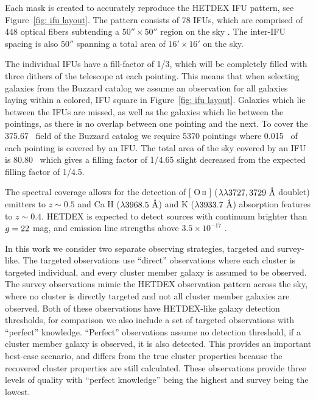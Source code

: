 \documentclass[fleqn,usenatbib]{mnras}
\makeatletter
\DeclareRobustCommand{\ion}[2]{%
\relax\ifmmode
\ifx\testbx\f@series
{\mathbf{#1\,\mathsc{#2}}}\else
{\mathrm{#1\,\mathsc{#2}}}\fi
\else\textup{#1\,{\mdseries\textsc{#2}}}%
\fi}
\makeatother
\begin{document}
Each mask is created to accurately reproduce the HETDEX IFU pattern, see Figure~\ref{fig: ifu layout}. The pattern consists of 78 IFUs, which are comprised of 448 optical fibers subtending a $50'' \times 50''$ region on the sky \citep{Kelz2014}. The inter-IFU spacing is also $50''$ spanning a total area of $16'\times 16'$ on the sky. 

The individual IFUs have a fill-factor of 1/3, which will be completely filled with three dithers of the telescope at each pointing. This means that when selecting galaxies from the Buzzard catalog we assume an observation for all galaxies laying within a colored, IFU square in Figure~\ref{fig: ifu layout}. Galaxies which lie between the IFUs are missed, as well as the galaxies which lie between the pointings, as there is no overlap between one pointing and the next. To cover the 375.67 \degsq\ field of the Buzzard catalog we require 5370 pointings where 0.015 \degsq\ of each pointing is covered by an IFU. The total area of the sky covered by an IFU is 80.80 \degsq\ which gives a filling factor of 1/4.65 slight decreased from the expected filling factor of 1/4.5.

The spectral coverage allows for the detection of [\ion{O}{ii}] ($\lambda\lambda 3727,3729~\hbox{\AA}$ doublet) emitters to $z\sim 0.5$ and Ca H ($\lambda 3968.5~\hbox{\AA}$) and K ($\lambda 3933.7~\hbox{\AA}$) absorption features to $z\sim 0.4$. HETDEX is expected to detect sources with continuum brighter than $\hbox{$g$}=22$ mag, and emission line strengths above $3.5\times10^{-17}$ \ergscm.

In this work we consider two separate observing strategies, targeted and survey-like. The targeted observations use ``direct'' observations where each cluster is targeted individual, and every cluster member galaxy is assumed to be observed. The survey observations mimic the HETDEX observation pattern across the sky, where no cluster is directly targeted and not all cluster member galaxies are observed. Both of these observations have HETDEX-like galaxy detection thresholds, for comparison we also include a set of targeted observations with ``perfect'' knowledge. ``Perfect'' observations assume no detection threshold, if a cluster member galaxy is observed, it is also detected. This provides an important best-case scenario, and differs from the true cluster properties because the recovered cluster properties are still calculated. These observations provide three levels of quality with ``perfect knowledge'' being the highest and survey being the lowest.
\end{document}
